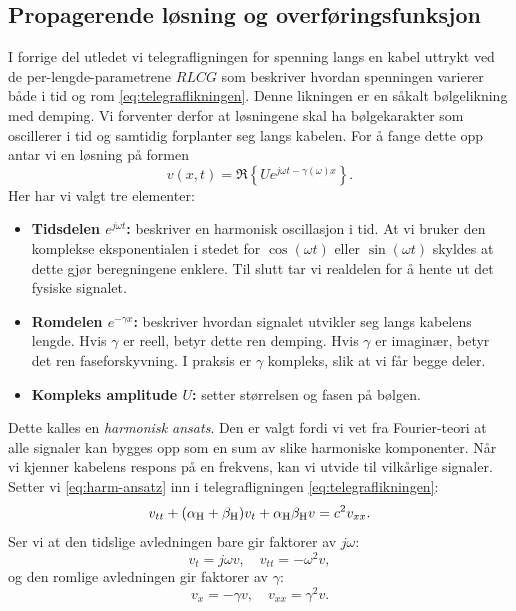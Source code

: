 \subsection{Propagerende løsning og overføringsfunksjon}

I forrige del utledet vi telegrafligningen for spenning langs en kabel uttrykt ved de per-lengde-parametrene $RLCG$ som beskriver hvordan spenningen varierer både i tid og rom \eqref{eq:telegraflikningen}. Denne likningen er en såkalt bølgelikning med demping. Vi forventer derfor at løsningene skal ha bølgekarakter som oscillerer i tid og samtidig forplanter seg langs kabelen. For å fange dette opp antar vi en løsning på formen \cite{HaytBuck2018}
\begin{equation}
v(x,t) = \Re\!\left\{ U e^{j\omega t - \gamma(\omega)x} \right\}.
\label{eq:harm-ansatz}
\end{equation}
Her har vi valgt tre elementer:
\begin{itemize}
    \item \textbf{Tidsdelen $e^{j\omega t}$:} beskriver en harmonisk oscillasjon i tid. At vi bruker den 
    komplekse eksponentialen i stedet for $\cos(\omega t)$ eller $\sin(\omega t)$ skyldes at dette 
    gjør beregningene enklere. Til slutt tar vi realdelen for å hente ut det fysiske signalet.\\
    \item \textbf{Romdelen $e^{-\gamma x}$:} beskriver hvordan signalet utvikler seg langs kabelens lengde. 
    Hvis $\gamma$ er reell, betyr dette ren demping. Hvis $\gamma$ er imaginær, betyr det ren faseforskyvning. 
    I praksis er $\gamma$ kompleks, slik at vi får begge deler.\\
    \item \textbf{Kompleks amplitude $U$:} setter størrelsen og fasen på bølgen.\\
\end{itemize}
Dette kalles en \emph{harmonisk ansats}. Den er valgt fordi vi vet fra Fourier-teori at alle signaler 
kan bygges opp som en sum av slike harmoniske komponenter. Når vi kjenner kabelens respons på en frekvens, 
kan vi utvide til vilkårlige signaler. Setter vi \eqref{eq:harm-ansatz} inn i telegrafligningen \eqref{eq:telegraflikningen}:
\[    
    v_{tt} + (\alpha_{\mathrm{H}} + \beta_{\mathrm{H}})v_{t} + \alpha_{\mathrm{H}} \beta_{\mathrm{H}} v = c^2 v_{xx}.
\]
Ser vi at den tidslige avledningen bare gir faktorer av $j\omega$:
\[
    v_{t} = j\omega v, \quad v_{tt} = -\omega^2 v,
\]
og den romlige avledningen gir faktorer av $\gamma$:
\[
    v_{x} = -\gamma v, \quad v_{xx} = \gamma^2 v.
\]
